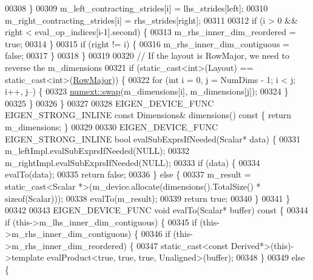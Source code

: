 \begin{DoxyCode}
00308       \}
00309       m\_left\_contracting\_strides[i] = lhs\_strides[left];
00310       m\_right\_contracting\_strides[i] = rhs\_strides[right];
00311 
00312       \textcolor{keywordflow}{if} (i > 0 && right < eval\_op\_indices[i-1].second) \{
00313         m\_rhs\_inner\_dim\_reordered = \textcolor{keyword}{true};
00314       \}
00315       \textcolor{keywordflow}{if} (right != i) \{
00316         m\_rhs\_inner\_dim\_contiguous = \textcolor{keyword}{false};
00317       \}
00318     \}
00319 
00320     \textcolor{comment}{// If the layout is RowMajor, we need to reverse the m\_dimensions}
00321     \textcolor{keywordflow}{if} (static\_cast<int>(Layout) == static\_cast<int>(\hyperlink{group__enums_ggaacded1a18ae58b0f554751f6cdf9eb13acfcde9cd8677c5f7caf6bd603666aae3}{RowMajor})) \{
00322       \textcolor{keywordflow}{for} (\textcolor{keywordtype}{int} i = 0, j = NumDims - 1; i < j; i++, j--) \{
00323         \hyperlink{endian_8c_a3ca5ecd34b04d6a243c054ac3a57f68d}{numext::swap}(m\_dimensions[i], m\_dimensions[j]);
00324       \}
00325     \}
00326   \}
00327 
00328   EIGEN\_DEVICE\_FUNC EIGEN\_STRONG\_INLINE \textcolor{keyword}{const} Dimensions& dimensions()\textcolor{keyword}{ const }\{ \textcolor{keywordflow}{return} m\_dimensions; \}
00329 
00330   EIGEN\_DEVICE\_FUNC EIGEN\_STRONG\_INLINE \textcolor{keywordtype}{bool} evalSubExprsIfNeeded(Scalar* data) \{
00331     m\_leftImpl.evalSubExprsIfNeeded(NULL);
00332     m\_rightImpl.evalSubExprsIfNeeded(NULL);
00333     \textcolor{keywordflow}{if} (data) \{
00334       evalTo(data);
00335       \textcolor{keywordflow}{return} \textcolor{keyword}{false};
00336     \} \textcolor{keywordflow}{else} \{
00337       m\_result = \textcolor{keyword}{static\_cast<}Scalar *\textcolor{keyword}{>}(m\_device.allocate(dimensions().TotalSize() * \textcolor{keyword}{sizeof}(Scalar)));
00338       evalTo(m\_result);
00339       \textcolor{keywordflow}{return} \textcolor{keyword}{true};
00340     \}
00341   \}
00342 
00343   EIGEN\_DEVICE\_FUNC \textcolor{keywordtype}{void} evalTo(Scalar* buffer)\textcolor{keyword}{ const }\{
00344     \textcolor{keywordflow}{if} (this->m\_lhs\_inner\_dim\_contiguous) \{
00345       \textcolor{keywordflow}{if} (this->m\_rhs\_inner\_dim\_contiguous) \{
00346         \textcolor{keywordflow}{if} (this->m\_rhs\_inner\_dim\_reordered) \{
00347           \textcolor{keyword}{static\_cast<}\textcolor{keyword}{const }Derived*\textcolor{keyword}{>}(\textcolor{keyword}{this})->\textcolor{keyword}{template} evalProduct<true, true, true, Unaligned>(buffer);
00348         \}
00349         \textcolor{keywordflow}{else} \{

\end{DoxyCode}
